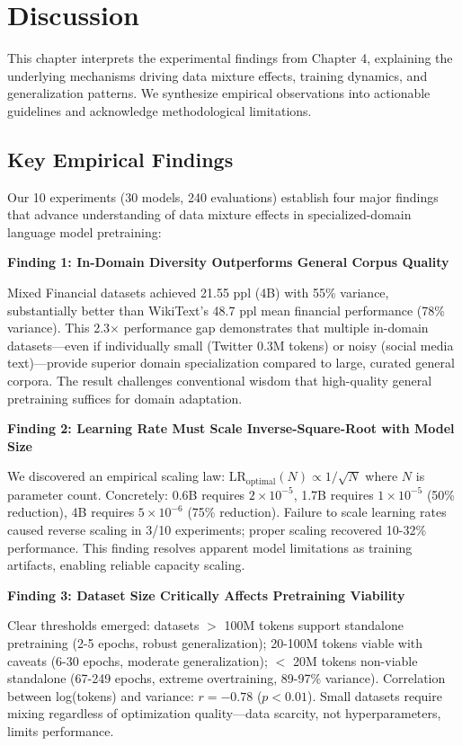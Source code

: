 \chapter{Discussion}

This chapter interprets the experimental findings from Chapter 4, explaining the underlying mechanisms driving data mixture effects, training dynamics, and generalization patterns. We synthesize empirical observations into actionable guidelines and acknowledge methodological limitations.

\section{Key Empirical Findings}

Our 10 experiments (30 models, 240 evaluations) establish four major findings that advance understanding of data mixture effects in specialized-domain language model pretraining:

\textbf{Finding 1: In-Domain Diversity Outperforms General Corpus Quality}

Mixed Financial datasets achieved 21.55 ppl (4B) with 55\% variance, substantially better than WikiText's 48.7 ppl mean financial performance (78\% variance). This 2.3$\times$ performance gap demonstrates that multiple in-domain datasets—even if individually small (Twitter 0.3M tokens) or noisy (social media text)—provide superior domain specialization compared to large, curated general corpora. The result challenges conventional wisdom that high-quality general pretraining suffices for domain adaptation.

\textbf{Finding 2: Learning Rate Must Scale Inverse-Square-Root with Model Size}

We discovered an empirical scaling law: $\text{LR}_{\text{optimal}}(N) \propto 1/\sqrt{N}$ where $N$ is parameter count. Concretely: 0.6B requires $2 \times 10^{-5}$, 1.7B requires $1 \times 10^{-5}$ (50\% reduction), 4B requires $5 \times 10^{-6}$ (75\% reduction). Failure to scale learning rates caused reverse scaling in 3/10 experiments; proper scaling recovered 10-32\% performance. This finding resolves apparent model limitations as training artifacts, enabling reliable capacity scaling.

\textbf{Finding 3: Dataset Size Critically Affects Pretraining Viability}

Clear thresholds emerged: datasets $>$ 100M tokens support standalone pretraining (2-5 epochs, robust generalization); 20-100M tokens viable with caveats (6-30 epochs, moderate generalization); $<$ 20M tokens non-viable standalone (67-249 epochs, extreme overtraining, 89-97\% variance). Correlation between log(tokens) and variance: $r = -0.78$ ($p < 0.01$). Small datasets require mixing regardless of optimization quality—data scarcity, not hyperparameters, limits performance.

